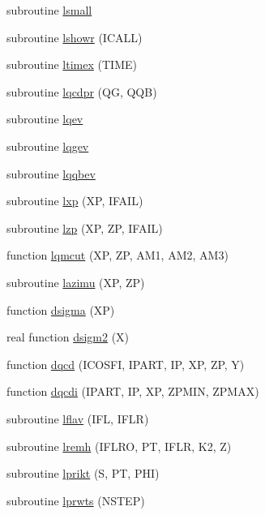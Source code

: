 \begin{DoxyCompactItemize}
\item 
subroutine \hyperlink{djangoh__l_8f_abe7e3135bb62ff0df78888cff990a5dc}{lsmall}
\item 
subroutine \hyperlink{djangoh__l_8f_aa0ba547c1a303967f78477246079eab9}{lshowr} (I\+C\+A\+LL)
\item 
subroutine \hyperlink{djangoh__l_8f_a08fec3dff1a4d1cc56eb1387e95550cf}{ltimex} (T\+I\+ME)
\item 
subroutine \hyperlink{djangoh__l_8f_a028774669b878dc254be7adc6a8b71fc}{lqcdpr} (QG, Q\+QB)
\item 
subroutine \hyperlink{djangoh__l_8f_a01abaac24ae901949706dffdf91c7743}{lqev}
\item 
subroutine \hyperlink{djangoh__l_8f_a23666489567c7a0e59195b6fd2173242}{lqgev}
\item 
subroutine \hyperlink{djangoh__l_8f_a3e28d56ef10931205d7a8812c117d667}{lqqbev}
\item 
subroutine \hyperlink{djangoh__l_8f_a48c1ad848298468cd3e394bccf6f5c0c}{lxp} (XP, I\+F\+A\+IL)
\item 
subroutine \hyperlink{djangoh__l_8f_a9a5bd2fc14de05db3e3517f441e0b4fa}{lzp} (XP, ZP, I\+F\+A\+IL)
\item 
function \hyperlink{djangoh__l_8f_a541c93d482139591c721854c34c5602b}{lqmcut} (XP, ZP, A\+M1, A\+M2, A\+M3)
\item 
subroutine \hyperlink{djangoh__l_8f_a362776648d80c982707ecbb3966e4485}{lazimu} (XP, ZP)
\item 
function \hyperlink{djangoh__l_8f_ae36552d48c86e467c1368e28727993fa}{dsigma} (XP)
\item 
real function \hyperlink{djangoh__l_8f_a3ae1de6009d8e73a2782ba12c5587ef2}{dsigm2} (X)
\item 
function \hyperlink{djangoh__l_8f_a53c2f56342fc25a988f9bc43320a8b3e}{dqcd} (I\+C\+O\+S\+FI, I\+P\+A\+RT, IP, XP, ZP, Y)
\item 
function \hyperlink{djangoh__l_8f_a0f3016de25315e77ff3ed85e168e78e6}{dqcdi} (I\+P\+A\+RT, IP, XP, Z\+P\+M\+IN, Z\+P\+M\+AX)
\item 
subroutine \hyperlink{djangoh__l_8f_a2f0e84e9b484d85d15f8ac53db3fc90c}{lflav} (I\+FL, I\+F\+LR)
\item 
subroutine \hyperlink{djangoh__l_8f_a906c87082ea73a4b56c8e5ae5220dcce}{lremh} (I\+F\+L\+RO, PT, I\+F\+LR, K2, Z)
\item 
subroutine \hyperlink{djangoh__l_8f_a86a7e05b81775926e5e11abdd235e202}{lprikt} (S, PT, P\+HI)
\item 
subroutine \hyperlink{djangoh__l_8f_a66eacd9bc5836bc43c41276ae41a6a59}{lprwts} (N\+S\+T\+EP)

\end{DoxyCompactItemize}

